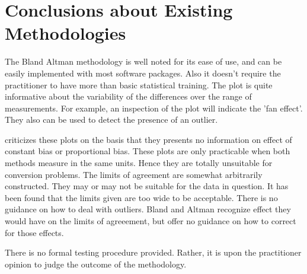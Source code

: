 \documentclass[MAIN.tex]{subfiles}
\begin{document}
	
	
	

	\section{Conclusions about Existing Methodologies}
	
	The Bland Altman methodology is well noted for its ease of use,
	and can be easily implemented with most software packages. Also it
	doesn't require the practitioner to have more than basic
	statistical training. The plot is quite informative about the
	variability of the differences over the range of measurements. For
	example, an inspection of the plot will indicate the 'fan effect'.
	They also can be used to detect the presence of an outlier.
	
	\citet{ludbrook97,ludbrook02} criticizes these plots on the
	basis that they presents no information on effect of constant bias
	or proportional bias. These plots are only practicable when both
	methods measure in the same units. Hence they are totally
	unsuitable for conversion problems. The limits of agreement are
	somewhat arbitrarily constructed. They may or may not be suitable
	for the data in question. It has been found that the limits given
	are too wide to be acceptable. There is no guidance on how to deal
	with outliers. Bland and Altman recognize effect they would have
	on the limits of agreeement, but offer no guidance on how to
	correct for those effects.
	
	There is no formal testing procedure provided. Rather, it is upon
	the practitioner opinion to judge the outcome of the methodology.
	
	
	
	
	
	
	
	
\end{document}
